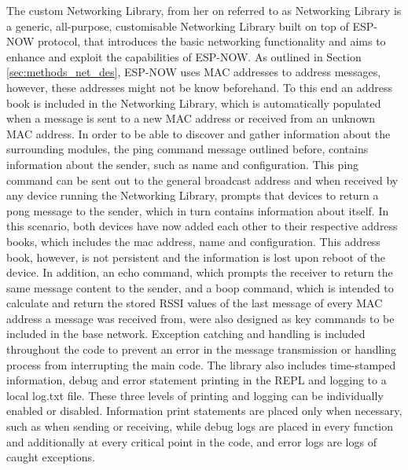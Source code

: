 The custom Networking Library, from her on referred to as Networking Library is a generic, all-purpose, customisable Networking Library built on top of ESP-NOW protocol, that introduces the basic networking functionality and aims to enhance and exploit the capabilities of ESP-NOW. As outlined in Section \ref{sec:methods_net_des}, ESP-NOW uses MAC addresses to address messages, however, these addresses might not be know beforehand. To this end an address book is included in the Networking Library, which is automatically populated when a message is sent to a new MAC address or received from an unknown MAC address. In order to be able to discover and gather information about the surrounding modules, the ping command message outlined before, contains information about the sender, such as name and configuration. This ping command can be sent out to the general broadcast address and when received by any device running the Networking Library, prompts that devices to return a pong message to the sender, which in turn contains information about itself. In this scenario, both devices have now added each other to their respective address books, which includes the mac address, name and configuration. This address book, however, is not persistent and the information is lost upon reboot of the device. In addition, an echo command, which prompts the receiver to return the same message content to the sender, and a boop command, which is intended to calculate and return the stored RSSI values of the last message of every MAC address a message was received from, were also designed as key commands to be included in the base network. Exception catching and handling is included throughout the code to prevent an error in the message transmission or handling process from interrupting the main code. The library also includes time-stamped information, debug and error statement printing in the REPL and logging to a local log.txt file. These three levels of printing and logging can be individually enabled or disabled. Information print statements are placed only when necessary, such as when sending or receiving, while debug logs are placed in every function and additionally at every critical point in the code, and error logs are logs of caught exceptions.\\

